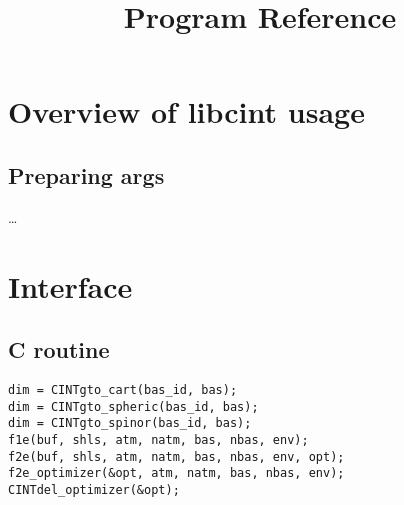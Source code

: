 \documentclass[]{article}
\title{Program Reference}
\author{}
\date{}
\begin{document}
\maketitle

{
\hypersetup{linkcolor=black}
\setcounter{tocdepth}{3}
\tableofcontents
}
\section{Overview of libcint usage}\label{overview-of-libcint-usage}

\subsection{Preparing args}\label{preparing-args}

\ldots{}

\section{Interface}\label{interface}

\subsection{C routine}\label{c-routine}

\begin{verbatim}
dim = CINTgto_cart(bas_id, bas);
dim = CINTgto_spheric(bas_id, bas);
dim = CINTgto_spinor(bas_id, bas);
f1e(buf, shls, atm, natm, bas, nbas, env);
f2e(buf, shls, atm, natm, bas, nbas, env, opt);
f2e_optimizer(&opt, atm, natm, bas, nbas, env);
CINTdel_optimizer(&opt);
\end{verbatim}
\end{document}
